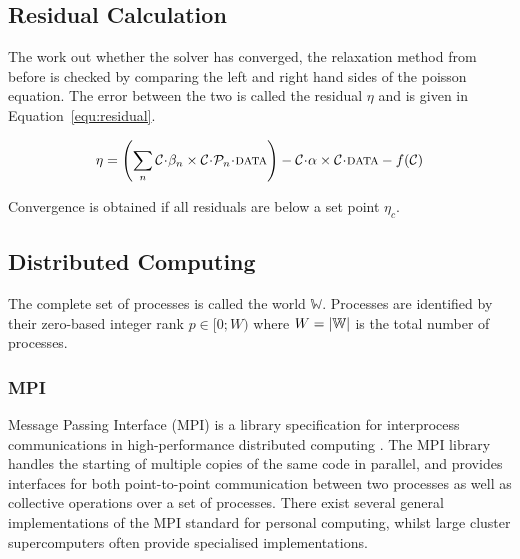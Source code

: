 \documentclass[twoside]{IIBproject}
\newcommand{\acc}{{\mkern 0.5mu\cdot\mkern 0.5mu}}
\numberwithin{figure}{section}
\begin{document}


    \subsection{Residual Calculation} %
        \label{sec:residual}

        The work out whether the solver has converged, the relaxation method from before is checked by comparing the left and right hand sides of the poisson equation. The error between the two is called the residual $\eta$ and is given in Equation~\ref{equ:residual}.

        \begin{equation}
            \eta = \left( \sum\limits_n \mathcal{C}\acc\beta_n \times \mathcal{C}\acc\mathcal{P}_n\acc\textproc{data} \right)
             - \mathcal{C}\acc\alpha \times \mathcal{C}\acc\textproc{data}
             -f(\mathcal{C}) 
             \label{equ:residual}
        \end{equation}

        Convergence is obtained if all residuals are below a set point $\eta_c$. 



    \subsection{Distributed Computing} %
        \label{sec:computing}

        The complete set of processes is called the world $\mathbb{W}$. Processes are identified by their zero-based integer rank $p \in [0;W)$ where $W=\abs{\mathbb{W}}$ is the total number of processes. 

        \subsubsection{MPI} %
            \label{sec:mpi}

            Message Passing Interface (MPI) is a library specification for interprocess communications in high-performance distributed computing \cite{mpi94}. The MPI library handles the starting of multiple copies of the same code in parallel, and provides interfaces for both point-to-point communication between two processes as well as collective operations over a set of processes. There exist several general implementations of the MPI standard for personal computing, whilst large cluster supercomputers often provide specialised implementations.
\end{document}

